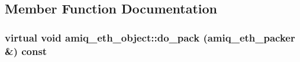 \subsection{Member Function Documentation}
\hypertarget{classamiq__eth__object_a1c8e3c7f04c5a75ccfdb5140f1559879}{
\subsubsection[{do\_\-pack}]{\setlength{\rightskip}{0pt plus 5cm}virtual void amiq\_\-eth\_\-object::do\_\-pack ({\bf amiq\_\-eth\_\-packer} \&) const}}
\label{classamiq__eth__object_a1c8e3c7f04c5a75ccfdb5140f1559879}


